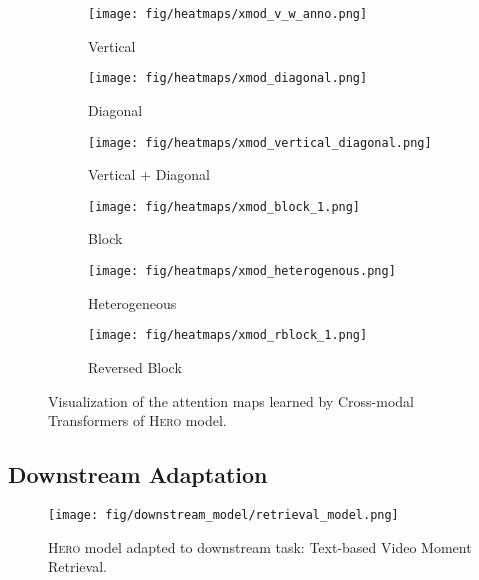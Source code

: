 \documentclass[11pt,a4paper]{article}
\begin{document}
\begin{figure*}[t!]
     \centering
     \begin{subfigure}[b]{0.32\textwidth}
         \centering
         \texttt{[image: fig/heatmaps/xmod\_v\_w\_anno.png]}
         \caption{Vertical}
         \label{xmod:vertical}
     \end{subfigure}
     \hfill
     \begin{subfigure}[b]{0.32\textwidth}
         \centering
         \texttt{[image: fig/heatmaps/xmod\_diagonal.png]}
         \caption{Diagonal}
         \label{xmod:diagonal}
     \end{subfigure}
     \hfill
     \begin{subfigure}[b]{0.32\textwidth}
         \centering
         \texttt{[image: fig/heatmaps/xmod\_vertical\_diagonal.png]}
         \caption{Vertical + Diagonal}
         \label{xmod:vnd}
     \end{subfigure}
        
     
     \begin{subfigure}[b]{0.32\textwidth}
         \centering
\texttt{[image: fig/heatmaps/xmod\_block\_1.png]}
         \caption{Block}
         \label{xmod:block}
     \end{subfigure}
     \hfill
     \begin{subfigure}[b]{0.32\textwidth}
         \centering
         \texttt{[image: fig/heatmaps/xmod\_heterogenous.png]}
         \caption{Heterogeneous}
         \label{xmod:heter}
     \end{subfigure}
     \hfill
     \begin{subfigure}[b]{0.32\textwidth}
         \centering
         \texttt{[image: fig/heatmaps/xmod\_rblock\_1.png]}
         \caption{Reversed Block}
         \label{xmod:rblock}
     \end{subfigure}
\caption{Visualization of the attention maps learned by Cross-modal Transformers of \textsc{Hero} model.}
\label{fig:xmodal_attn}
\end{figure*}

 
 
\subsection{Downstream Adaptation}
\begin{figure*}[!t]
\centering
  \texttt{[image: fig/downstream\_model/retrieval\_model.png]}
 \caption{\textsc{Hero} model adapted to downstream task: Text-based Video Moment Retrieval.} 
  \label{fig:retrieval_model}
\end{figure*} 
\end{document}
